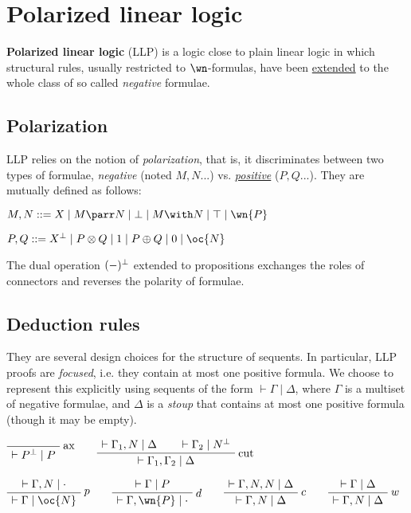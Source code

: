 \chapter{Polarized linear logic}\label{polarized-linear-logic}

\textbf{Polarized linear logic} (LLP) is a logic close to plain linear
logic in which structural rules, usually restricted to \(\wn\)-formulas,
have been \hyperref[generalized-structural-rules-pos]{extended} to the
whole class of so called \emph{negative} formulae.

\section{Polarization}\label{polarization}

LLP relies on the notion of \emph{polarization}, that is, it
discriminates between two types of formulae, \emph{negative} (noted
\(M, N...\)) vs. \emph{\hyperref[positive-formula]{positive}} (\(P, Q...\)).
They are mutually defined as follows:

\(M, N ::= X \mid M \parr N \mid \bot \mid M \with N \mid \top \mid \wn{P}\)

\(P, Q ::= X\orth \mid P \otimes Q \mid 1 \mid P \oplus Q \mid 0 \mid \oc{N}\)

The dual operation \((-)^\bot\) extended to propositions exchanges the
roles of connectors and reverses the polarity of formulae.

\section{Deduction rules}\label{deduction-rules}

They are several design choices for the structure of sequents. In
particular, LLP proofs are \emph{focused}, i.e. they contain at most
one positive formula. We choose to represent this explicitly using
sequents of the form \(\vdash\Gamma\mid\Delta\), where \(\Gamma\) is a
multiset of negative formulae, and \(\Delta\) is a \emph{stoup} that
contains at most one positive formula (though it may be empty).

\(\LabelRule{\rulename{ax}}
\NulRule{\vdash P\orth \mid P}
\DisplayProof
\qquad
\AxRule{\vdash \Gamma_1, N \mid \Delta}
\AxRule{\vdash \Gamma_2 \mid N\orth}
\LabelRule{\rulename{cut}}
\BinRule{\vdash\Gamma_1, \Gamma_2 \mid \Delta}
\DisplayProof\)

\(\AxRule{\vdash\Gamma, N\mid\cdot}
\LabelRule{p}
\UnaRule{\vdash\Gamma\mid \oc{N}}
\DisplayProof
\qquad
\AxRule{\vdash\Gamma\mid P}
\LabelRule{d}
\UnaRule{\vdash\Gamma,\wn{P}\mid \cdot}
\DisplayProof
\qquad
\AxRule{\vdash\Gamma,N,N\mid \Delta}
\LabelRule{c}
\UnaRule{\vdash\Gamma, N\mid\Delta}
\DisplayProof
\qquad
\AxRule{\vdash\Gamma\mid \Delta}
\LabelRule{w}
\UnaRule{\vdash\Gamma,N\mid\Delta}
\DisplayProof\)

